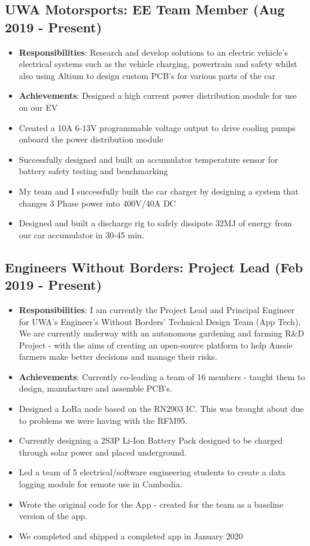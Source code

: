 \documentclass{article}[a4page]
\begin{document}
\subsection*{UWA Motorsports: EE Team Member \hfill (Aug 2019 - Present)}
\begin{itemize}
\item \textbf{Responsibilities}: Research and develop solutions to an electric vehicle’s electrical systems such as the vehicle charging, powertrain and safety whilst also using Altium to design custom PCB’s for various parts of the car
\item \textbf{Achievements}: Designed a high current power distribution module for use on our EV
\item Created a 10A 6-13V programmable voltage output to drive cooling pumps onboard the power distribution module
\item Successfully designed and built an accumulator temperature sensor for battery safety testing and benchmarking
\item My team and I successfully built the car charger by designing a system that changes 3 Phase power into 400V/40A DC
\item Designed and built a discharge rig to safely dissipate 32MJ of energy from our car accumulator in 30-45 min.
\end{itemize}

\subsection*{Engineers Without Borders: Project Lead \hfill (Feb 2019 - Present)}
\begin{itemize}
\item \textbf{Responsibilities}: I am currently the Project Lead and Principal Engineer for UWA's Engineer's Without Borders' Technical Design Team (App Tech). We are currently underway with an autonomous gardening and farming R\&D Project - with the aims of creating an open-source platform to help Aussie farmers make better decisions and manage their risks. 
\item \textbf{Achievements}: Currently co-leading a team of 16 members - taught them to design, manufacture and assemble PCB's. 
\item Designed a LoRa node based on the RN2903 IC. This was brought about due to problems we were having with the RFM95.
\item Currently designing a 2S3P Li-Ion Battery Pack designed to be charged through solar power and placed underground.
\item Led a team of 5 electrical/software engineering students to create a data logging module for remote use in Cambodia.
\item Wrote the original code for the App - created for the team as a baseline version of the app. 
\item We completed and shipped a completed app in January 2020
\end{itemize}
\end{document}
